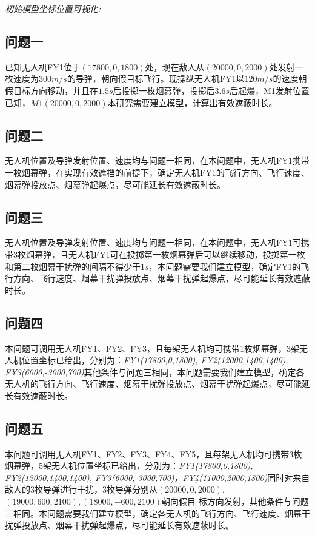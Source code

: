\documentclass{article}
\begin{document}
\textit{初始模型坐标位置可视化:}

\subsection{问题一}

已知无人机FY1位于$(17800,0,1800)$处，现在敌人从$(20000,0,2000)$处发射一枚速度为$300m/s$的导弹，朝向假目标飞行。现操纵无人机FY1以$120m/s$的速度朝假目标方向移动，并且在$1.5s$后投掷一枚烟幕弹，投掷后$3.6s$后起爆，M1发射位置已知，$M1(20000,0,2000)$本研究需要建立模型，计算出有效遮蔽时长。
\subsection{问题二}

无人机位置及导弹发射位置、速度均与问题一相同，在本问题中，无人机FY1携带一枚烟幕弹，在实现有效遮挡的前提下，确定无人机FY1的飞行方向、飞行速度、烟幕弹投放点、烟幕弹起爆点，尽可能延长有效遮蔽时长。
\subsection{问题三}

无人机位置及导弹发射位置、速度均与问题一相同，在本问题中，无人机FY1可携带3枚烟幕弹，且无人机FY1可在投掷第一枚烟幕弹后可以继续移动，投掷第一枚和第二枚烟幕干扰弹的间隔不得少于$1s$，本问题需要我们建立模型，确定FY1的飞行方向、飞行速度、烟幕干扰弹投放点、烟幕干扰弹起爆点，尽可能延长有效遮蔽时长。
\subsection{问题四}

本问题可调用无人机FY1、FY2、FY3，且每架无人机均可携带1枚烟幕弹，3架无人机位置坐标已给出，分别为：\textit{FY1(17800,0,1800), FY2(12000,1400,1400), FY3(6000,-3000,700)}其他条件与问题三相同，本问题需要我们建立模型，确定各无人机的飞行方向、飞行速度、烟幕干扰弹投放点、烟幕干扰弹起爆点，尽可能延长有效遮蔽时长。
\subsection{问题五}

本问题可调用无人机FY1、FY2、FY3、FY4、FY5，且每架无人机均可携带3枚烟幕弹，5架无人机位置坐标已给出，分别为：\textit{FY1(17800,0,1800), FY2(12000,1400,1400), FY3(6000,-3000,700)，FY4(11000,2000,1800)}同时对来自敌人的3枚导弹进行干扰，3枚导弹分别从$(20000,0,2000),$$(19000,600,2100),(18000,-600,2100)$朝向假目
标方向发射，其他条件与问题三相同。本问题需要我们建立模型，确定各无人机的飞行方向、飞行速度、烟幕干扰弹投放点、烟幕干扰弹起爆点，尽可能延长有效遮蔽时长。
\end{document}
